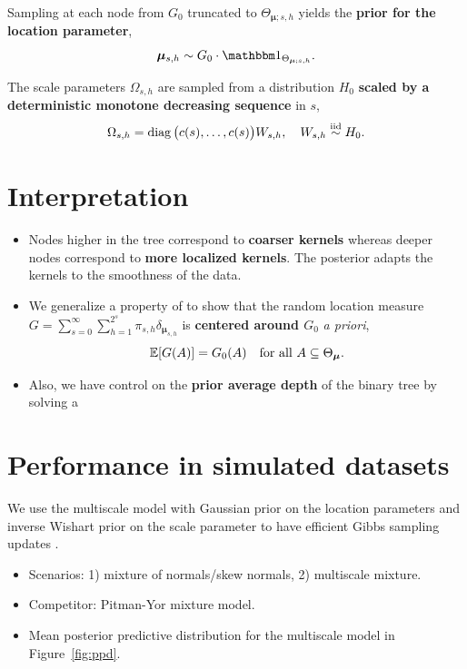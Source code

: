 \documentclass[a0,portrait]{a0poster}
\begin{document}
\begin{multicols}{2}
\begin{itemize}
        Sampling at each node from $ G_0$ truncated to $ \Theta_{\bm{\mu}; s,h}$ yields the \textbf{prior for the location parameter},
        \[
            \bm{\mu}_{s,h} \sim G_0 \cdot \one_{\Theta_{\bm{\mu};s, h}}.
        \]
        
        
        The scale parameters $ \Omega_{s,h}$ are sampled from a distribution $ H_0$ \textbf{scaled by a deterministic monotone decreasing sequence} in $ s$,
        \[
                        \Omega_{s,h} = \operatorname{diag} \big( c(s), \ldots, c(s) \big) W_{s,h}, \quad W_{s,h} \overset{\text{iid}}{\sim} H_0.
        \]
\end{itemize}

\color{DarkRed}
\section*{Interpretation}
\label{prop}
\color{Black}

\begin{itemize}
\item Nodes higher in the tree correspond to \textbf{coarser kernels} whereas deeper nodes correspond to \textbf{more localized kernels}.
    The posterior adapts the kernels to the smoothness of the data.
\item We generalize a property of \citet{stefanucci2021} to show that the random location measure $G = \sum_{s=0}^{\infty }\sum_{h=1}^{2^s} \pi_{s,h} \delta_{\bm{\mu}_{s,h}}$ is \textbf{centered around $ G_0$} \textit{a priori},
    \[
        \mathbb{E}[G(A)] = G_0(A)\quad \text{for all $ A \subseteq \Theta_{\bm{\mu}}$}.
    \]
    
\item Also, we have control on the \textbf{prior average depth} of the binary tree by solving a 

\end{itemize}
\color{DarkRed}
\vspace{-0.3cm}

\color{DarkRed}
\section*{Performance in simulated datasets}
\color{Black}
We use the multiscale model with Gaussian prior on the location parameters and inverse Wishart prior on the scale parameter to have efficient Gibbs sampling updates \citep{kalli2011}.
\begin{itemize}
\item Scenarios: 1) mixture of normals/skew normals, 2) multiscale mixture.
\item Competitor: Pitman-Yor mixture model.
\item Mean posterior predictive distribution for the multiscale model in Figure~\ref{fig:ppd}.
\end{itemize}


\end{multicols}
\end{document}
